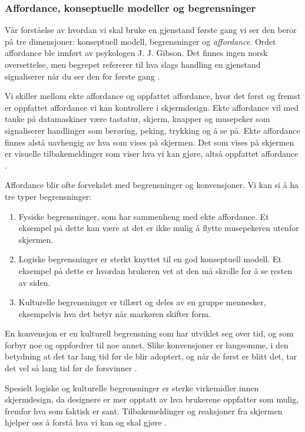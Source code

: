 \subsubsection{Affordance, konseptuelle modeller og begrensninger}
Vår forståelse av hvordan vi skal bruke en gjenstand første gang vi ser den beror på tre dimensjoner: konseptuell modell, begrensninger og \emph{affordance}. Ordet affordance ble innført av psykologen J. J. Gibson. Det finnes ingen norsk oversettelse, men begrepet refererer til hva slags handling en gjenstand signaliserer når du ser den for første gang \cite{Norman99}.

\noindent
Vi skiller mellom ekte affordance og oppfattet affordance, hvor det først og fremst er oppfattet affordance vi kan kontrollere i skjermdesign. Ekte affordance vil med tanke på datamaskiner være tastatur, skjerm, knapper og musepeker som signaliserer handlinger som berøring, peking, trykking og å se på. Ekte affordance finnes alstå uavhengig av hva som vises på skjermen. Det som vises på skjermen er visuelle tilbakemeldinger som viser hva vi kan gjøre, altså oppfattet affordance \cite{Norman99}.

\noindent
Affordance blir ofte forvekslet med begrensninger og konvensjoner. Vi kan si å ha tre typer begrensninger:
\begin{enumerate}
\item Fysiske begrensninger, som har sammenheng med ekte affordance. Et eksempel på dette kan være at det er ikke mulig å flytte musepekeren utenfor skjermen. 
\item Logiske begrensninger er sterkt knyttet til en god konseptuell modell. Et eksempel på dette er hvordan brukeren vet at den må skrolle for å se resten av siden.
\item Kulturelle begrensninger er tillært og deles av en gruppe mennesker, eksempelvis hva det betyr når markøren skifter form.
\end{enumerate}
En konvensjon er en kulturell begrensning som har utviklet seg over tid, og som forbyr noe og oppfordrer til noe annet. Slike konvensjoner er langsomme, i den betydning at det tar lang tid før de blir adoptert, og når de først er blitt det, tar det vel så lang tid før de forsvinner \cite{Norman99}.

\noindent
Spesielt logiske og kulturelle begrensninger er sterke virkemidler innen skjermdesign, da designere er mer opptatt av hva brukerene oppfatter som mulig, fremfor hva som faktisk er sant. Tilbakemeldinger og reaksjoner fra skjermen hjelper oss å forstå hva vi kan og skal gjøre \cite{Norman99}.